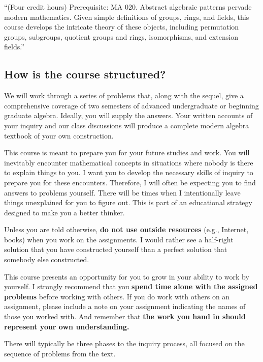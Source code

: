 \documentclass[
  twoside]{article}
\begin{document}
``(Four credit hours) Prerequisite: MA 020. Abstract algebraic patterns
pervade modern mathematics. Given simple definitions of groups, rings,
and fields, this course develops the intricate theory of these objects,
including permutation groups, subgroups, quotient groups and rings,
isomorphisms, and extension fields.''

\hypertarget{how-is-the-course-structured}{%
\subsection{How is the course
structured?}\label{how-is-the-course-structured}}

We will work through a series of problems that, along with the sequel,
give a comprehensive coverage of two semesters of advanced undergraduate
or beginning graduate algebra. Ideally, you will supply the answers.
Your written accounts of your inquiry and our class discussions will
produce a complete modern algebra textbook of your own construction.

This course is meant to prepare you for your future studies and work.
You will inevitably encounter mathematical concepts in situations where
nobody is there to explain things to you. I want you to develop the
necessary skills of inquiry to prepare you for these encounters.
Therefore, I will often be expecting you to find answers to problems
yourself. There will be times when I intentionally leave things
unexplained for you to figure out. This is part of an educational
strategy designed to make you a better thinker.

Unless you are told otherwise, \textbf{do not use outside resources}
(e.g., Internet, books) when you work on the assignments. I would rather
see a half-right solution that you have constructed yourself than a
perfect solution that somebody else constructed.

This course presents an opportunity for you to grow in your ability to
work by yourself. I strongly recommend that you
\textbf{spend time alone with the assigned problems} before working with
others. If you do work with others on an assignment, please include a
note on your assignment indicating the names of those you worked with.
And remember that
\textbf{the work you hand in should represent your own understanding.}

There will typically be three phases to the inquiry process, all focused
on the sequence of problems from the text.
\end{document}

